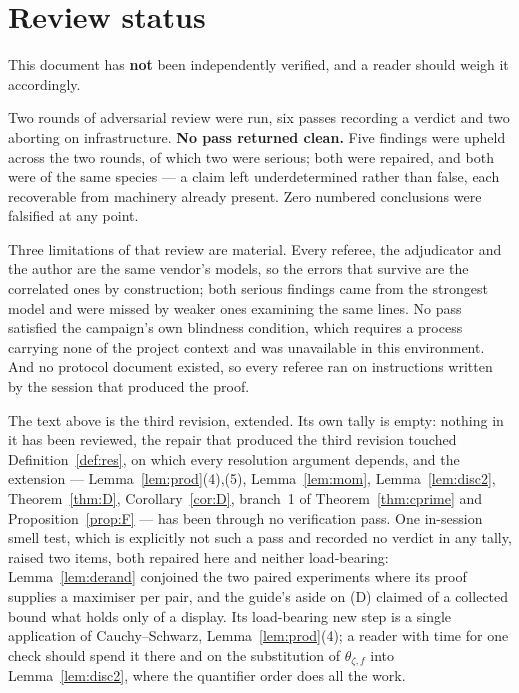 \documentclass{aicr-solution}
\begin{document}
\section{Review status}\label{sec:review}

This document has \textbf{not} been independently verified, and a reader should
weigh it accordingly.

Two rounds of adversarial review were run, six passes recording a verdict and two
aborting on infrastructure. \textbf{No pass returned clean.} Five findings were
upheld across the two rounds, of which two were serious; both were repaired, and
both were of the same species --- a claim left underdetermined rather than false,
each recoverable from machinery already present. Zero numbered conclusions were
falsified at any point.

Three limitations of that review are material. Every referee, the adjudicator and
the author are the same vendor's models, so the errors that survive are the
correlated ones by construction; both serious findings came from the strongest
model and were missed by weaker ones examining the same lines. No pass satisfied
the campaign's own blindness condition, which requires a process carrying none of
the project context and was unavailable in this environment. And no protocol
document existed, so every referee ran on instructions written by the session
that produced the proof.

The text above is the third revision, extended. Its own tally is empty: nothing in
it has been reviewed, the repair that produced the third revision touched
Definition~\ref{def:res}, on which every resolution argument depends, and the
extension --- Lemma~\ref{lem:prod}(4),(5), Lemma~\ref{lem:mom},
Lemma~\ref{lem:disc2}, Theorem~\ref{thm:D}, Corollary~\ref{cor:D}, branch~1 of
Theorem~\ref{thm:cprime} and Proposition~\ref{prop:F} --- has been through no
verification pass. One in-session smell test, which is explicitly not such a pass
and recorded no verdict in any tally, raised two items, both repaired here and
neither load-bearing: Lemma~\ref{lem:derand} conjoined the two paired experiments
where its proof supplies a maximiser per pair, and the guide's aside on (D)
claimed of a collected bound what holds only of a display. Its load-bearing new
step is a single application of
Cauchy--Schwarz, Lemma~\ref{lem:prod}(4); a reader with time for one check should
spend it there and on the substitution of $\theta_{\zeta,f}$ into
Lemma~\ref{lem:disc2}, where the quantifier order does all the work.
\end{document}
